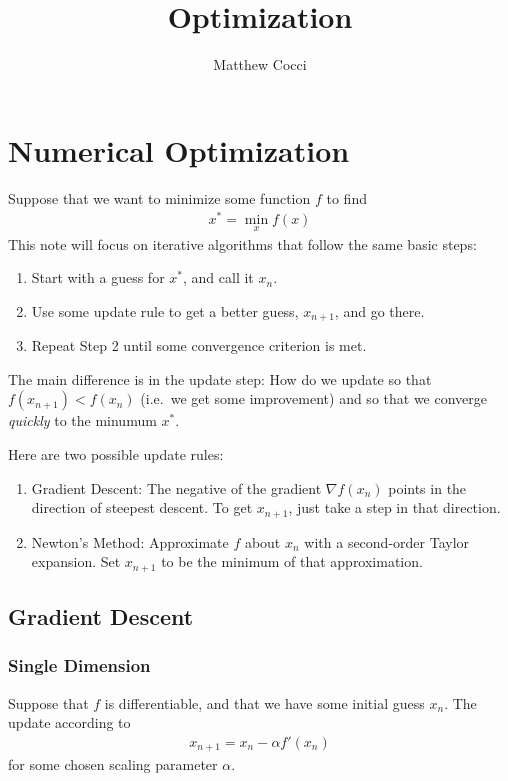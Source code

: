 \documentclass[a4paper,12pt]{scrartcl}
\author{Matthew Cocci}
\title{Optimization}
\date{}
\theoremstyle{definition}
\theoremstyle{remark}
\begin{document}
\maketitle

\tableofcontents %



\clearpage
\section{Numerical Optimization}

Suppose that we want to minimize some function $f$ to find
\begin{align}
  \label{statement}
  x^* = \min_x f(x)
\end{align}
This note will focus on iterative algorithms that follow the same basic
steps:
\begin{enumerate}
  \item Start with a guess for $x^*$, and call it $x_n$.
  \item Use some update rule to get a better guess, $x_{n+1}$, and go
    there.
  \item Repeat Step 2 until some convergence criterion is met.
\end{enumerate}
The main difference is in the update step: How do we update so that
$f(x_{n+1}) < f(x_n)$ (i.e.\ we get some improvement) and so that we
converge \emph{quickly} to the minumum $x^*$.

Here are two possible update rules:
\begin{enumerate}
  \item Gradient Descent: The negative of the gradient $\nabla f(x_n)$
    points in the direction of steepest descent. To get $x_{n+1}$, just
    take a step in that direction.
  \item Newton's Method: Approximate $f$ about $x_n$ with a second-order
    Taylor expansion. Set $x_{n+1}$ to be the minimum of that approximation.
\end{enumerate}


\subsection{Gradient Descent}

\subsubsection{Single Dimension}

Suppose that $f$ is differentiable, and that we have some initial guess
$x_n$. The update according to
\begin{align*}
  x_{n+1} = x_n - \alpha f'(x_n)
\end{align*}
for some chosen scaling parameter $\alpha$.
\end{document}
